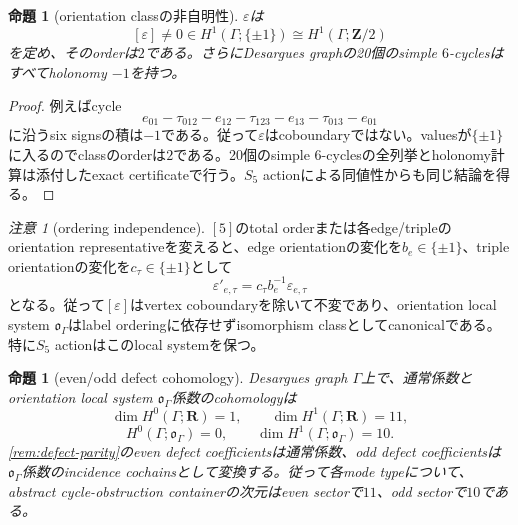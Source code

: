 \documentclass[11pt,a4paper]{ltjsarticle}
\newtheorem{proposition}[theorem]{命題}
\theoremstyle{definition}
\theoremstyle{remark}
\newtheorem{remark}[theorem]{注意}
\newcommand{\RR}{\mathbf R}
\newcommand{\ZZ}{\mathbf Z}
\begin{document}
\begin{proposition}[orientation classの非自明性]\label{prop:orientation-class}
$\varepsilon$は
\[
 [\varepsilon]\ne0\in H^1(\Gamma;\{\pm1\})
 \cong H^1(\Gamma;\ZZ/2)
\]
を定め、そのorderは$2$である。さらにDesargues graphの20個のsimple $6$-cyclesはすべてholonomy $-1$を持つ。
\end{proposition}

\begin{proof}
例えばcycle
\[
 e_{01}-\tau_{012}-e_{12}-\tau_{123}
 -e_{13}-\tau_{013}-e_{01}
\]
に沿うsix signsの積は$-1$である。従って$\varepsilon$はcoboundaryではない。valuesが$\{\pm1\}$に入るのでclassのorderは$2$である。20個のsimple $6$-cyclesの全列挙とholonomy計算は添付したexact certificateで行う。$S_5$ actionによる同値性からも同じ結論を得る。
\end{proof}

\begin{remark}[ordering independence]\label{rem:orientation-order-independence}
$[5]$のtotal orderまたは各edge/tripleのorientation representativeを変えると、edge orientationの変化を$b_e\in\{\pm1\}$、triple orientationの変化を$c_\tau\in\{\pm1\}$として
\[
 \varepsilon'_{e,\tau}=c_\tau b_e^{-1}\varepsilon_{e,\tau}
\]
となる。従って$[\varepsilon]$はvertex coboundaryを除いて不変であり、orientation local system $\mathfrak o_\Gamma$はlabel orderingに依存せずisomorphism classとしてcanonicalである。特に$S_5$ actionはこのlocal systemを保つ。
\end{remark}


\begin{proposition}[even/odd defect cohomology]\label{prop:twisted-defect-cohomology}
Desargues graph $\Gamma$上で、通常係数とorientation local system $\mathfrak o_\Gamma$係数のcohomologyは
\begin{equation}\label{eq:ordinary-twisted-H1-dimensions}
 \dim H^0(\Gamma;\RR)=1,
 \qquad
 \dim H^1(\Gamma;\RR)=11,
\end{equation}
\begin{equation}\label{eq:twisted-H1-dimensions}
 H^0(\Gamma;\mathfrak o_\Gamma)=0,
 \qquad
 \dim H^1(\Gamma;\mathfrak o_\Gamma)=10.
\end{equation}
\cref{rem:defect-parity}のeven defect coefficientsは通常係数、odd defect coefficientsは$\mathfrak o_\Gamma$係数のincidence cochainsとして変換する。従って各mode typeについて、abstract cycle-obstruction containerの次元はeven sectorで$11$、odd sectorで$10$である。
\end{proposition}
\end{document}
